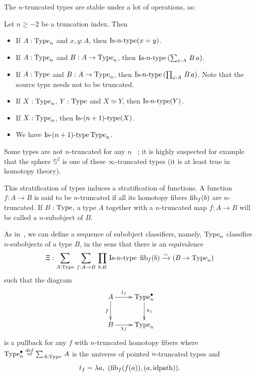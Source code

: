 The $n$-truncated types are stable under a lot of operations, as:
\begin{lem}
  Let $n\geqslant -2$ be a truncation index. Then
  \begin{itemize}
  \item If $A:\operatorname{Type}_n$ and $x,y:A$, then $\mathop{\mathrm{Is{\hbox{-}}}n\mathrm{{\hbox{-}} type}} (x=y)$.
  \item If $A:\operatorname{Type}_n$ and $B:A\to\operatorname{Type}_n$, then $\mathop{\mathrm{Is{\hbox{-}}}n\mathrm{{\hbox{-}} type}}
    \left(\sum_{x:A}\, B\, a\right)$.
  \item If $A:\operatorname{Type}$ and $B:A\to\operatorname{Type}_n$, then $\mathop{\mathrm{Is{\hbox{-}}}n\mathrm{{\hbox{-}} type}} \left(\prod_{x:A}\, B\, a\right)$. Note that the source type needs not to be truncated.
  \item If $X:\operatorname{Type}_n$, $Y:\operatorname{Type}$ and $X\simeq Y$, then $\mathop{\mathrm{Is{\hbox{-}}}n\mathrm{{\hbox{-}} type}}(Y)$.
  \item If $X:\operatorname{Type}_n$, then $\mathop{\mathrm{Is{\hbox{-}}}(n+1)\mathrm{{\hbox{-}} type}}(X)$.
  \item We have $\mathop{\mathrm{Is{\hbox{-}}}(n+1)\mathrm{{\hbox{-}} type}}{\operatorname{Type}_n}$.
  \end{itemize}
\end{lem}

\begin{rmq}
Some types are not $n$-truncated for any
$n$~\cite[Example 8.8.6]{hottbook} ; it is highly suspected for
example that the sphere $\mathbb S^2$ is one of
these $\infty$-truncated types (it is at least true in homotopy theory).  
\end{rmq}


This stratification of types induces a stratification of functions. A
function $f:A\to B$ is said to be $n$-truncated if all its homotopy
fibers $\mathrm{fib}_{f}(b)$ are $n$-truncated. If $B:\operatorname{Type}$, a type $A$ together
with a $n$-truncated map $f:A\to B$ will be called a $n$-subobject of $B$.

As in~\cite{sets_in_hott}, we can define a sequence of subobject
classifiers, namely, $\operatorname{Type}_n$ classifies $n$-subobjects of a type
$B$, in the sens that there is an equivalence
\[\Xi : \sum_{A:\operatorname{Type}}\, \sum_{f:A\to B}\, \prod_{b:B}\, \mathop{\mathrm{Is{\hbox{-}}}n\mathrm{{\hbox{-}} type}}\
\mathrm{fib}_{f}(b) \xrightarrow{\sim} 
 (B \to \operatorname{Type}_n)\]
such that the diagram
\[
\xymatrix{
  A \ar[r]^{\hspace{-1em} t_f} \ar[d]_f & \Type_n^\bullet \ar[d]^{\pi_1}\\
  B \ar[r]_{\hspace{-1em} \chi_f} & \Type_n
}
\]
is a pullback for any $f$ with
 $n$-truncated homotopy fibers where $\operatorname{Type}_n^\bullet \overset{de\hspace{-0.2ex}f}{=}
 \sum_{A:\operatorname{Type}}\, A$ is the universe of pointed
$n$-truncated types and 
\[ t_f = \lambda a,~(\mathrm{fib}_{f}(f(a)),(a,\mathrm{idpath})). \]

